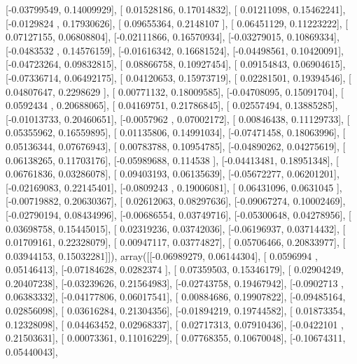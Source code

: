 \documentclass{article}
\begin{document}
       [-0.03799549,  0.14009929],
       [ 0.01528186,  0.17014832],
       [ 0.01211098,  0.15462241],
       [-0.0129824 ,  0.17930626],
       [ 0.09655364,  0.2148107 ],
       [ 0.06451129,  0.11223222],
       [ 0.07127155,  0.06808804],
       [-0.02111866,  0.16570934],
       [-0.03279015,  0.10869334],
       [-0.0483532 ,  0.14576159],
       [-0.01616342,  0.16681524],
       [-0.04498561,  0.10420091],
       [-0.04723264,  0.09832815],
       [ 0.08866758,  0.10927454],
       [ 0.09154843,  0.06904615],
       [-0.07336714,  0.06492175],
       [ 0.04120653,  0.15973719],
       [ 0.02281501,  0.19394546],
       [ 0.04807647,  0.2298629 ],
       [ 0.00771132,  0.18009585],
       [-0.04708095,  0.15091704],
       [ 0.0592434 ,  0.20688065],
       [ 0.04169751,  0.21786845],
       [ 0.02557494,  0.13885285],
       [-0.01013733,  0.20460651],
       [-0.0057962 ,  0.07002172],
       [ 0.00846438,  0.11129733],
       [ 0.05355962,  0.16559895],
       [ 0.01135806,  0.14991034],
       [-0.07471458,  0.18063996],
       [ 0.05136344,  0.07676943],
       [ 0.00783788,  0.10954785],
       [-0.04890262,  0.04275619],
       [ 0.06138265,  0.11703176],
       [-0.05989688,  0.114538  ],
       [-0.04413481,  0.18951348],
       [ 0.06761836,  0.03286078],
       [ 0.09403193,  0.06135639],
       [-0.05672277,  0.06201201],
       [-0.02169083,  0.22145401],
       [-0.0809243 ,  0.19006081],
       [ 0.06431096,  0.0631045 ],
       [-0.00719882,  0.20630367],
       [ 0.02612063,  0.08297636],
       [-0.09067274,  0.10002469],
       [-0.02790194,  0.08434996],
       [-0.00686554,  0.03749716],
       [-0.05300648,  0.04278956],
       [ 0.03698758,  0.15445015],
       [ 0.02319236,  0.03742036],
       [-0.06196937,  0.03714432],
       [ 0.01709161,  0.22328079],
       [ 0.00947117,  0.03774827],
       [ 0.05706466,  0.20833977],
       [ 0.03944153,  0.15032281]]), array([[-0.06989279,  0.06144304],
       [ 0.0596994 ,  0.05146413],
       [-0.07184628,  0.0282374 ],
       [ 0.07359503,  0.15346179],
       [ 0.02904249,  0.20407238],
       [-0.03239626,  0.21564983],
       [-0.02743758,  0.19467942],
       [-0.0902713 ,  0.06383332],
       [-0.04177806,  0.06017541],
       [ 0.00884686,  0.19907822],
       [-0.09485164,  0.02856098],
       [ 0.03616284,  0.21304356],
       [-0.01894219,  0.19744582],
       [ 0.01873354,  0.12328098],
       [ 0.04463452,  0.02968337],
       [ 0.02717313,  0.07910436],
       [-0.0422101 ,  0.21503631],
       [ 0.00073361,  0.11016229],
       [ 0.07768355,  0.10670048],
       [-0.10674311,  0.05440043],
\end{document}
